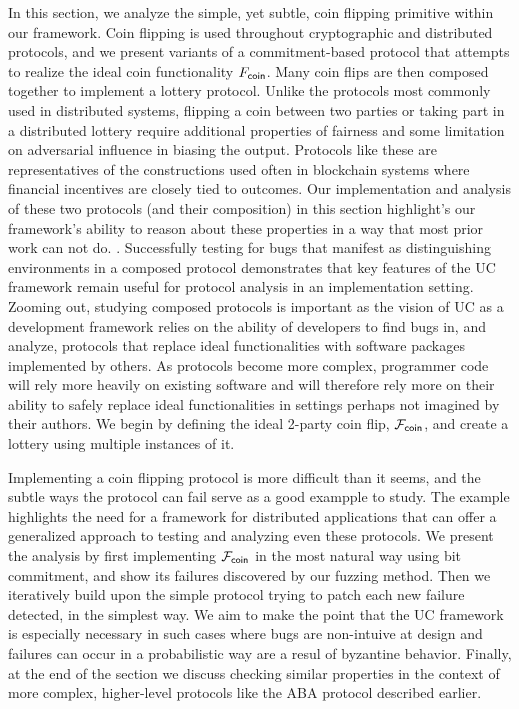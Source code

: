 In this section, we analyze the simple, yet subtle, coin flipping primitive
within our framework.  Coin flipping is used throughout cryptographic and
distributed protocols, and we present variants of a commitment-based protocol
that attempts to realize the ideal coin functionality $F_{{\mathsf {coin}}}$.  Many coin
flips are then composed together to implement a lottery protocol.  Unlike the
protocols most commonly used in distributed systems, flipping a coin between
two parties or taking part in a distributed lottery require additional
properties of fairness and some limitation on adversarial influence in biasing
the output. Protocols like these are representatives of the constructions used
often in blockchain systems where financial incentives are closely tied to
outcomes.  Our implementation and analysis of these two protocols (and their
composition) in this section highlight's our framework's ability to reason
about these properties in a way that most prior work can not do.  .  Successfully testing for bugs that manifest as distinguishing
environments in a composed protocol demonstrates that key features of the UC
framework remain useful for protocol analysis in an implementation setting.
Zooming out, studying composed protocols is important as the vision of UC as a
development framework relies on the ability of developers to find bugs in, and
analyze, protocols that replace ideal functionalities with software packages
implemented by others.  As protocols become more complex, programmer code will
rely more heavily on existing software and will therefore rely more on their
ability to safely replace ideal functionalities in settings perhaps not
imagined by their authors.  We begin by defining the ideal 2-party coin flip,
$\mathcal{F}_{{\mathsf {coin}}}$, and create a lottery using multiple instances of it.

Implementing a coin flipping protocol is more difficult than it seems, and the
subtle ways the protocol can fail serve as a good exampple to study.  The
example highlights the need for a framework for distributed applications that
can offer a generalized approach to testing and analyzing even these protocols.
We present the analysis by first implementing $\mathcal{F}_{{\mathsf {coin}}}$ in the most natural
way using bit commitment, and show its failures discovered by our fuzzing
method.  Then we iteratively build upon the simple protocol trying to patch
each new failure detected, in the simplest way. We aim to make the point that
the UC framework is especially necessary in such cases where bugs are
non-intuive at design and failures can occur in a probabilistic way are a resul
of byzantine behavior. Finally, at the end of the section we discuss checking
similar properties in the context of more complex, higher-level protocols like
the ABA protocol described earlier.

